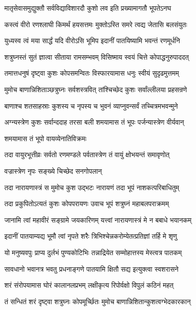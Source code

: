 \twolineshloka
{मातृसेवासमुद्युक्तौ सर्वविद्याविशारदौ}
{कुशो लव इति प्रख्यामागतौ भूपतेऽनघ}%

\twolineshloka
{कस्त्वं वीरो रणश्लाघी किमर्थं हयसत्तमः}
{मुक्तोऽस्ति समरे त्वद्य जेतासि बलसंयुतः}%

\twolineshloka
{युध्यस्व त्वं मया सार्द्धं यदि वीरोऽसि भूमिप}
{इदानीं पातयिष्यामि भवन्तं रणमूर्धनि}%

\twolineshloka
{शत्रुघ्नस्तं सुतं ज्ञात्वा सीताया रामसम्भवम्}
{विसिष्माय स्वयं चित्ते कोपाद्धनुरुपाददत्}%

\twolineshloka
{तमात्तधनुषं दृष्ट्वा कुशः कोपसमन्वितः}
{विस्फारयामास धनुः स्वीयं सुदृढमुत्तमम्}%

\twolineshloka
{मुमोच बाणान्निशिताञ्छत्रुघ्नः सर्वशस्त्रवित्}
{तांश्चिच्छेद कुशः सर्वांल्लीलया प्रहसन्रणे}%

\twolineshloka
{बाणाश्च शतसाहस्राः कुशस्य च नृपस्य च}
{भुवनं व्याप्नुवन्सर्वं तच्चित्रमभवन्मुने}%

\twolineshloka
{अग्न्यस्त्रेण कुशः सर्वान्ददाह तरसा बली}
{शमयामास तं भूपः पर्जन्यास्त्रेण वीर्यवान्}%

शमयामास तं भूपो वायव्येनातिविक्रमः

\twolineshloka
{तदा वायुरभूत्तीव्रः सर्वतो रणमण्डले}
{पर्वतास्त्रेण तं वायुं क्षोभयन्तं समावृणोत्}%

वज्रास्त्रेण नृपः सङ्ख्ये चिच्छेद सनगोपलान्

\twolineshloka
{तदा नारायणास्त्रं स मुमोच कुश उद्भटः}
{नारायणं तदा भूपं नाशकत्परिबाधितुम्}%

\twolineshloka
{तदा प्रकुपितोऽत्यतं कुशः कोपपरायणः}
{उवाच भूपं शत्रुघ्नं महाबलपराक्रमम्}%

\twolineshloka
{जानामि त्वां महावीरं सङ्ग्रामे जयकारिणम्}
{यत्त्वां नारायणास्त्रं मे न बबाधे भयानकम्}%

\twolineshloka
{इदानीं पातयाम्यद्य भूमौ त्वां नृपते शरैः}
{त्रिभिश्चेन्नकरोम्येतत्प्रतिज्ञां तर्हि मे शृणु}%

\twolineshloka
{यो मनुष्यवपुः प्राप्य दुर्लभं पुण्यकोटिभिः}
{तन्नाद्रियेत सम्मोहात्तस्य मेस्त्वत्र पातकम्}%

\twolineshloka
{सावधानो भवानत्र भवतु प्रधनाङ्गणे}
{पातयामि क्षितौ सद्य इत्युक्त्वा स्वशरासने}%

\twolineshloka
{शरं संरोपयामास घोरं कालानलप्रभम्}
{लक्षीकृत्य रिपोर्वक्षो विपुलं कठिनं महत्}%

\twolineshloka
{तं सन्धितं शरं दृष्ट्वा शत्रुघ्नः कोपमूर्च्छितः}
{मुमोच बाणान्निशितान्कुशत्वग्भेदकारकान्}%

